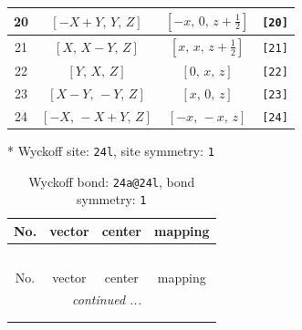 \documentclass[fleqn,8pt]{jsarticle}
\begin{document}
\begin{longtable}{cccc}
20 & $\left[ - X + Y,\, Y,\, Z \right]$ & $\left[ - x,\, 0,\, z + \frac{1}{2} \right]$ & {\tt [20]} \\ \hline
21 & $\left[ X,\, X - Y,\, Z \right]$ & $\left[ x,\, x,\, z + \frac{1}{2} \right]$ & {\tt [21]} \\ \hline
22 & $\left[ Y,\, X,\, Z \right]$ & $\left[ 0,\, x,\, z \right]$ & {\tt [22]} \\ \hline
23 & $\left[ X - Y,\, - Y,\, Z \right]$ & $\left[ x,\, 0,\, z \right]$ & {\tt [23]} \\ \hline
24 & $\left[ - X,\, - X + Y,\, Z \right]$ & $\left[ - x,\, - x,\, z \right]$ & {\tt [24]} \\
\end{longtable}
* Wyckoff site: {\tt 24l}, site symmetry: {\tt 1}
\renewcommand{\arraystretch}{1.2}
\begin{longtable}{cccc}
\caption{Wyckoff bond: {\tt 24a@24l}, bond symmetry: {\tt 1}}
 \\
 \hline \hline
No. & vector & center & mapping \\ \hline \endfirsthead

\multicolumn{3}{l}{\tablename\ \thetable{}} \\
 \hline \hline
No. & vector & center & mapping \\ \hline \endhead

 \hline \hline
\multicolumn{3}{r}{\footnotesize\it continued ...} \\ \endfoot

 \hline \hline
\multicolumn{3}{r}{} \\ \endlastfoot


\end{longtable}
\end{document}
